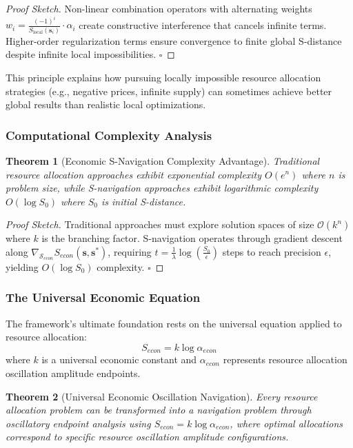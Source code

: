 \documentclass[12pt,a4paper]{article}
\newtheorem{theorem}{Theorem}
\begin{document}
\begin{proof}[Proof Sketch]
Non-linear combination operators with alternating weights $w_i = \frac{(-1)^i}{S_{\text{local}}(\mathbf{s}_i)} \cdot \alpha_i$ create constructive interference that cancels infinite terms. Higher-order regularization terms ensure convergence to finite global S-distance despite infinite local impossibilities. $\square$
\end{proof}

This principle explains how pursuing locally impossible resource allocation strategies (e.g., negative prices, infinite supply) can sometimes achieve better global results than realistic local optimizations.

\subsubsection{Computational Complexity Analysis}

\begin{theorem}[Economic S-Navigation Complexity Advantage]
Traditional resource allocation approaches exhibit exponential complexity $O(e^n)$ where $n$ is problem size, while S-navigation approaches exhibit logarithmic complexity $O(\log S_0)$ where $S_0$ is initial S-distance.
\end{theorem}

\begin{proof}[Proof Sketch]
Traditional approaches must explore solution spaces of size $\mathcal{O}(k^n)$ where $k$ is the branching factor. S-navigation operates through gradient descent along $\nabla_{\mathcal{S}_{econ}} S_{econ}(\mathbf{s}, \mathbf{s}^*)$, requiring $t = \frac{1}{\lambda} \log(\frac{S_0}{\epsilon})$ steps to reach precision $\epsilon$, yielding $O(\log S_0)$ complexity. $\square$
\end{proof}

\subsubsection{The Universal Economic Equation}

The framework's ultimate foundation rests on the universal equation applied to resource allocation:
\begin{equation}
S_{econ} = k \log \alpha_{econ}
\end{equation}
where $k$ is a universal economic constant and $\alpha_{econ}$ represents resource allocation oscillation amplitude endpoints.

\begin{theorem}[Universal Economic Oscillation Navigation]
Every resource allocation problem can be transformed into a navigation problem through oscillatory endpoint analysis using $S_{econ} = k \log \alpha_{econ}$, where optimal allocations correspond to specific resource oscillation amplitude configurations.
\end{theorem}
\end{document}
